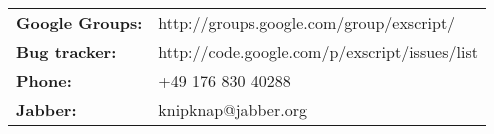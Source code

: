 \begin{tabular}{ll}
{\bf Google Groups:} & http://groups.google.com/group/exscript/ \\
{\bf Bug tracker:}   & http://code.google.com/p/exscript/issues/list \\
{\bf Phone:}         & +49 176 830 40288 \\
{\bf Jabber:}        & knipknap@jabber.org
\end{tabular}
